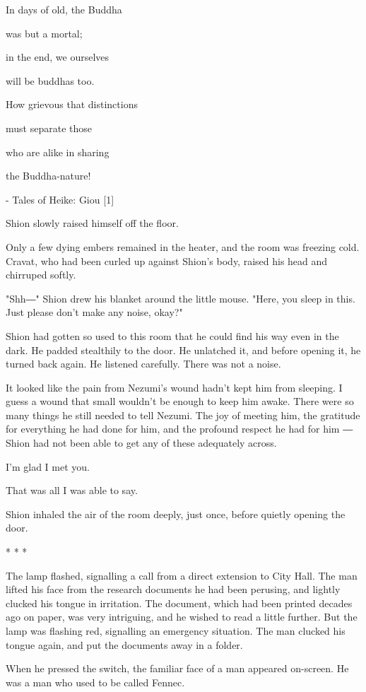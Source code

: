 In days of old, the Buddha

was but a mortal;

in the end, we ourselves

will be buddhas too.

How grievous that distinctions

must separate those

who are alike in sharing

the Buddha-nature!

- Tales of Heike: Giou {[}1{]}

Shion slowly raised himself off the floor.

Only a few dying embers remained in the heater, and the room was
freezing cold. Cravat, who had been curled up against Shion's body,
raised his head and chirruped softly.

"Shh―" Shion drew his blanket around the little mouse. "Here, you sleep
in this. Just please don't make any noise, okay?"

Shion had gotten so used to this room that he could find his way even in
the dark. He padded stealthily to the door. He unlatched it, and before
opening it, he turned back again. He listened carefully. There was not a
noise.

It looked like the pain from Nezumi's wound hadn't kept him from
sleeping. I guess a wound that small wouldn't be enough to keep him
awake. There were so many things he still needed to tell Nezumi. The joy
of meeting him, the gratitude for everything he had done for him, and
the profound respect he had for him ― Shion had not been able to get any
of these adequately across.

I'm glad I met you.

That was all I was able to say.

Shion inhaled the air of the room deeply, just once, before quietly
opening the door.

* * *

The lamp flashed, signalling a call from a direct extension to City
Hall. The man lifted his face from the research documents he had been
perusing, and lightly clucked his tongue in irritation. The document,
which had been printed decades ago on paper, was very intriguing, and he
wished to read a little further. But the lamp was flashing red,
signalling an emergency situation. The man clucked his tongue again, and
put the documents away in a folder.

When he pressed the switch, the familiar face of a man appeared
on-screen. He was a man who used to be called Fennec.

